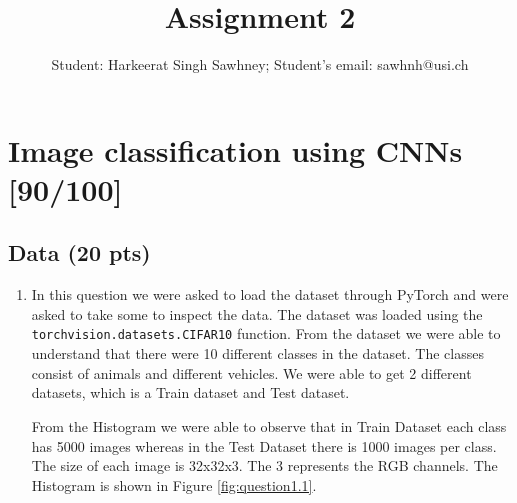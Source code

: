 \documentclass[a4paper]{article}
\title{Assignment 2}
\author{Student: Harkeerat Singh Sawhney; Student's email: sawhnh@usi.ch}
\newcommand{\codeword}[1]{\texttt{\textcolor{code}{#1}}}
\begin{document}
\maketitle

\section{Image classification using CNNs [90/100]}
\subsection{Data (20 pts)}
\begin{enumerate}
	\item In this question we were asked to load the dataset through PyTorch and were asked to take some to inspect the data. The dataset was loaded using the \codeword{torchvision.datasets.CIFAR10} function. From the dataset we were able to understand that there were 10 different classes in the dataset. The classes consist of animals and different vehicles. We were able to get 2 different datasets, which is a Train dataset and Test dataset.

	      From the Histogram we were able to observe that in Train Dataset each class has 5000 images whereas in the Test Dataset there is 1000 images per class. The size of each image is 32x32x3. The 3 represents the RGB channels. The Histogram is shown in Figure \ref{fig:question1.1}.


\end{enumerate}
\end{document}
